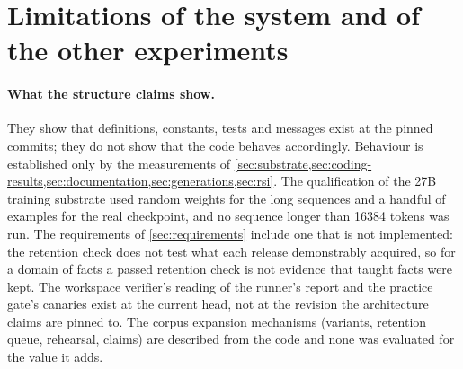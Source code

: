
\section{Limitations of the system and of the other experiments}\label{app:limits}

\paragraph{What the structure claims show.} They show that definitions, constants, tests and messages
exist at the pinned commits; they do not show that the code behaves accordingly. Behaviour is
established only by the measurements of
\cref{sec:substrate,sec:coding-results,sec:documentation,sec:generations,sec:rsi}. The qualification
of the 27B training substrate used random weights for the long sequences and a handful of examples for
the real checkpoint, and no sequence longer than 16384 tokens was run. The requirements of
\cref{sec:requirements} include one that is not implemented: the retention check does not test what
each release demonstrably acquired, so for a domain of facts a passed retention check is not evidence
that taught facts were kept. The workspace verifier's reading of the runner's report and the practice
gate's canaries exist at the current head, not at the revision the architecture claims are pinned
to. The corpus expansion mechanisms (variants, retention queue, rehearsal, claims) are
described from the code and none was evaluated for the value it adds.

